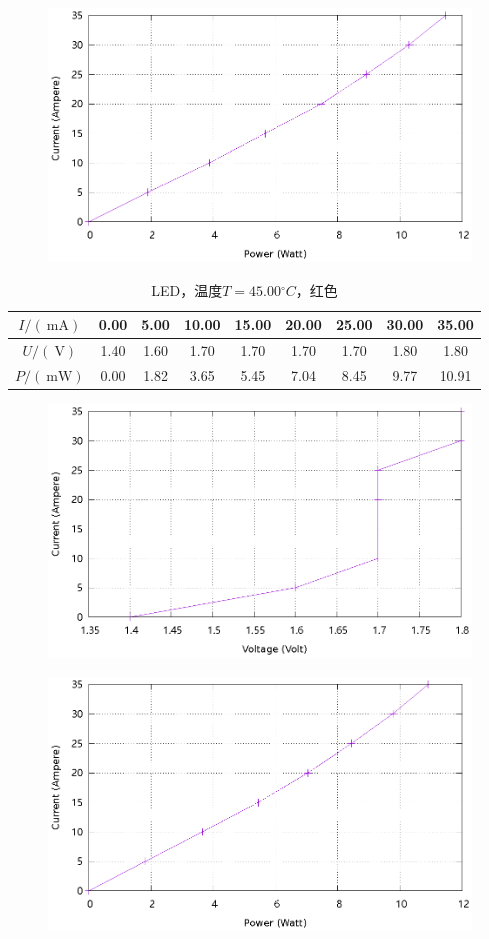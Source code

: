 \documentclass{ctexart}
\newcommand{\si}[1]{\  \mathrm{#1}}
\begin{document}
\begin{figure}[H]
    \centering
    \includegraphics[width=0.9\linewidth]{../output/led-pc-5.gnuplot}
\end{figure}
\newpage
\begin{table}[H]
    \centering
    \begin{tabular}{|c|c|c|c|c|c|c|c|c|}
        \hline
        $I/(\si{mA})$   & 0.00 & 5.00 & 10.00 & 15.00 & 20.00 & 25.00 & 30.00 & 35.00 \\\hline
        $U / (\si{V})$  & 1.40 & 1.60 & 1.70 & 1.70 & 1.70 & 1.70 & 1.80 & 1.80 \\\hline
        $P / (\si{mW})$ & 0.00 & 1.82 & 3.65 & 5.45 & 7.04 & 8.45 & 9.77 & 10.91 \\\hline
    \end{tabular}
    \caption{LED，温度$T=45.00{}^{\circ}C$，红色}
\end{table}
\begin{figure}[H]
    \centering
    \includegraphics[width=0.9\linewidth]{../output/led-vc-6.gnuplot}
\end{figure}
\begin{figure}[H]
    \centering
    \includegraphics[width=0.9\linewidth]{../output/led-pc-6.gnuplot}
\end{figure}
\end{document}
